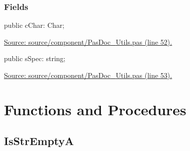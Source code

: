 \documentclass{report}
\newif\ifpdf
\begin{document}
\subsubsection*{\large{\textbf{Fields}}\normalsize\hspace{1ex}\hfill}
\begin{list}{}{
\setlength{\itemindent}{0cm}
\setlength{\listparindent}{0cm}
\setlength{\leftmargin}{\evensidemargin}
\addtolength{\leftmargin}{\tmplength}
\settowidth{\labelsep}{X}
\addtolength{\leftmargin}{\labelsep}
\setlength{\labelwidth}{\tmplength}
}
\label{PasDoc_Utils.TCharReplacement-cChar}
\item[\textbf{cChar}\hfill]
\ifpdf
\begin{flushleft}
\fi
\begin{ttfamily}
public cChar: Char;\end{ttfamily}

\ifpdf
\end{flushleft}
\fi


\par  \par
\href{https://github.com/pasdoc/pasdoc/blob/master/source/component/PasDoc_Utils.pas#L52}{Source: source/component/PasDoc{\_}Utils.pas (line 52).}\label{PasDoc_Utils.TCharReplacement-sSpec}
\item[\textbf{sSpec}\hfill]
\ifpdf
\begin{flushleft}
\fi
\begin{ttfamily}
public sSpec: string;\end{ttfamily}

\ifpdf
\end{flushleft}
\fi


\par  \par
\href{https://github.com/pasdoc/pasdoc/blob/master/source/component/PasDoc_Utils.pas#L53}{Source: source/component/PasDoc{\_}Utils.pas (line 53).}\end{list}
\section{Functions and Procedures}
\ifpdf
\subsection*{\large{\textbf{IsStrEmptyA}}\normalsize\hspace{1ex}\hrulefill}
\else
\end{document}
